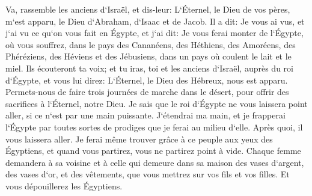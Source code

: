 \verse Va, rassemble les anciens d`Israël, et dis-leur: L`Éternel, le Dieu de vos pères, m`est apparu, le Dieu d`Abraham, d`Isaac et de Jacob. Il a dit: Je vous ai vus, et j`ai vu ce qu`on vous fait en Égypte, 
\verse et j`ai dit: Je vous ferai monter de l`Égypte, où vous souffrez, dans le pays des Cananéens, des Héthiens, des Amoréens, des Phéréziens, des Héviens et des Jébusiens, dans un pays où coulent le lait et le miel. 
\verse Ils écouteront ta voix; et tu iras, toi et les anciens d`Israël, auprès du roi d`Égypte, et vous lui direz: L`Éternel, le Dieu des Hébreux, nous est apparu. Permets-nous de faire trois journées de marche dans le désert, pour offrir des sacrifices à l`Éternel, notre Dieu. 
\verse Je sais que le roi d`Égypte ne vous laissera point aller, si ce n`est par une main puissante. 
\verse J`étendrai ma main, et je frapperai l`Égypte par toutes sortes de prodiges que je ferai au milieu d`elle. Après quoi, il vous laissera aller. 
\verse Je ferai même trouver grâce à ce peuple aux yeux des Égyptiens, et quand vous partirez, vous ne partirez point à vide. 
\verse Chaque femme demandera à sa voisine et à celle qui demeure dans sa maison des vases d`argent, des vases d`or, et des vêtements, que vous mettrez sur vos fils et vos filles. Et vous dépouillerez les Égyptiens. 

